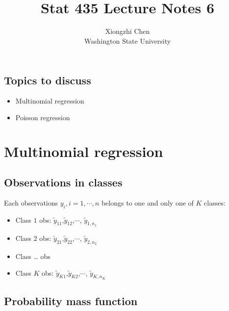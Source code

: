 \documentclass[]{article}
\title{Stat 435 Lecture Notes 6}
\author{Xiongzhi Chen \\ Washington State University}
\date{}
\providecommand{\tightlist}{%
  \setlength{\itemsep}{0pt}\setlength{\parskip}{0pt}}
\begin{document}
\maketitle

{
\setcounter{tocdepth}{2}
\tableofcontents
}
\section{}\label{section}

\subsection{Topics to discuss}\label{topics-to-discuss}

\begin{itemize}
\tightlist
\item
  Multinomial regression
\item
  Poisson regression
\end{itemize}

\section{Multinomial regression}\label{multinomial-regression}

\subsection{Observations in classes}\label{observations-in-classes}

Each observations \(y_i,i=1,\cdots,n\) belongs to one and only one of
\(K\) classes:

\begin{itemize}
\tightlist
\item
  Class \(1\) obs: \(\tilde{y}_{11}\),\(\tilde{y}_{12}\),\(\cdots\),
  \(\tilde{y}_{1,n_{1}}\)
\item
  Class \(2\) obs: \(\tilde{y}_{21}\),\(\tilde{y}_{22}\),\(\cdots\),
  \(\tilde{y}_{2,n_{2}}\)
\item
  Class \ldots{} obs
\item
  Class \(K\) obs: \(\tilde{y}_{K1}\),\(\tilde{y}_{K2}\),\(\cdots\),
  \(\tilde{y}_{K,n_{K}}\)
\end{itemize}

\subsection{Probability mass function}\label{probability-mass-function}
\end{document}
